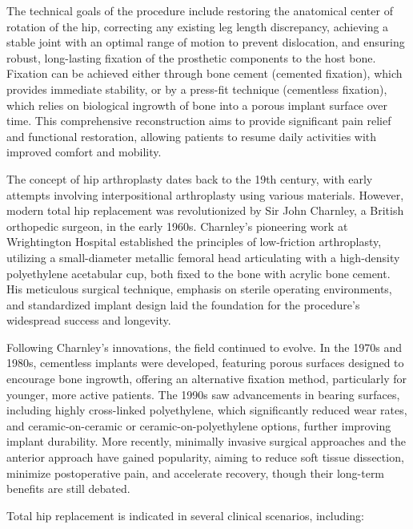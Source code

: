 The technical goals of the procedure include restoring the anatomical center of rotation of the hip, correcting any existing leg length discrepancy, achieving a stable joint with an optimal range of motion to prevent dislocation, and ensuring robust, long-lasting fixation of the prosthetic components to the host bone. Fixation can be achieved either through bone cement (cemented fixation), which provides immediate stability, or by a press-fit technique (cementless fixation), which relies on biological ingrowth of bone into a porous implant surface over time. This comprehensive reconstruction aims to provide significant pain relief and functional restoration, allowing patients to resume daily activities with improved comfort and mobility.

The concept of hip arthroplasty dates back to the 19th century, with early attempts involving interpositional arthroplasty using various materials. However, modern total hip replacement was revolutionized by Sir John Charnley, a British orthopedic surgeon, in the early 1960s. Charnley's pioneering work at Wrightington Hospital established the principles of low-friction arthroplasty, utilizing a small-diameter metallic femoral head articulating with a high-density polyethylene acetabular cup, both fixed to the bone with acrylic bone cement. His meticulous surgical technique, emphasis on sterile operating environments, and standardized implant design laid the foundation for the procedure's widespread success and longevity.

Following Charnley's innovations, the field continued to evolve. In the 1970s and 1980s, cementless implants were developed, featuring porous surfaces designed to encourage bone ingrowth, offering an alternative fixation method, particularly for younger, more active patients. The 1990s saw advancements in bearing surfaces, including highly cross-linked polyethylene, which significantly reduced wear rates, and ceramic-on-ceramic or ceramic-on-polyethylene options, further improving implant durability. More recently, minimally invasive surgical approaches and the anterior approach have gained popularity, aiming to reduce soft tissue dissection, minimize postoperative pain, and accelerate recovery, though their long-term benefits are still debated.

Total hip replacement is indicated in several clinical scenarios, including:

